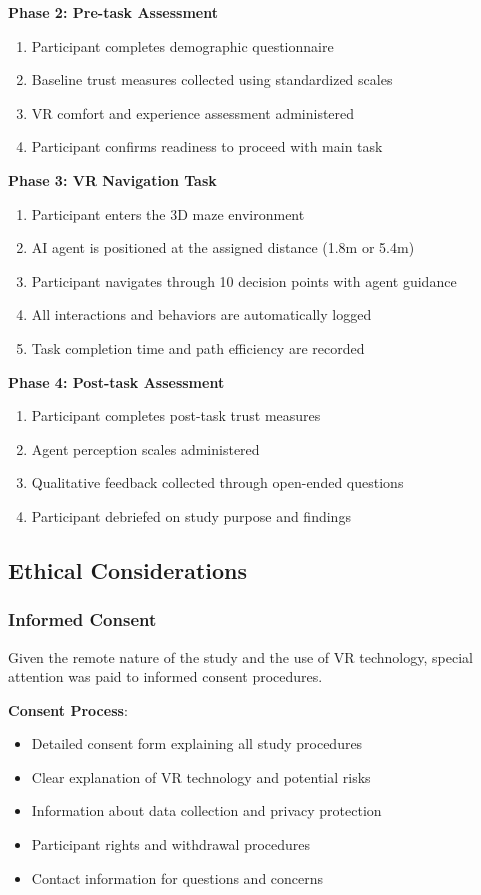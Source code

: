 \documentclass[12pt]{article}
\begin{document}
\textbf{Phase 2: Pre-task Assessment}
\begin{enumerate}
    \item Participant completes demographic questionnaire
    \item Baseline trust measures collected using standardized scales
    \item VR comfort and experience assessment administered
    \item Participant confirms readiness to proceed with main task
\end{enumerate}

\textbf{Phase 3: VR Navigation Task}
\begin{enumerate}
    \item Participant enters the 3D maze environment
    \item AI agent is positioned at the assigned distance (1.8m or 5.4m)
    \item Participant navigates through 10 decision points with agent guidance
    \item All interactions and behaviors are automatically logged
    \item Task completion time and path efficiency are recorded
\end{enumerate}

\textbf{Phase 4: Post-task Assessment}
\begin{enumerate}
    \item Participant completes post-task trust measures
    \item Agent perception scales administered
    \item Qualitative feedback collected through open-ended questions
    \item Participant debriefed on study purpose and findings
\end{enumerate}

\subsection{Ethical Considerations}

\subsubsection{Informed Consent}

Given the remote nature of the study and the use of VR technology, special attention was paid to informed consent procedures.

\textbf{Consent Process}:
\begin{itemize}
    \item Detailed consent form explaining all study procedures
    \item Clear explanation of VR technology and potential risks
    \item Information about data collection and privacy protection
    \item Participant rights and withdrawal procedures
    \item Contact information for questions and concerns
\end{itemize}
\end{document}
